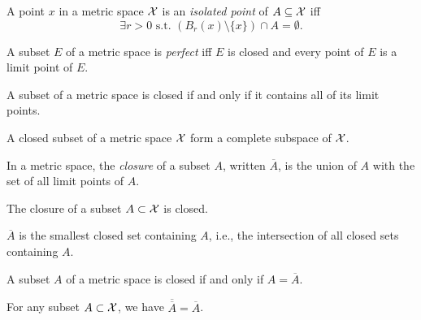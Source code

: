 \begin{defn}
  A point $x$ in a metric space ${\cal X}$
   is an \emph{isolated point} of $A\subseteq {\cal X}$ iff
  \begin{equation}
    \label{eq:isolatedPointMetricSpace}
    \exists r>0 \text{ s.t. } \left(B_r(x)\setminus\{x\}\right)\cap A
    = \emptyset. 
  \end{equation}
\end{defn}

\begin{defn}
  \label{def:perfectSets}
  A subset $E$ of a metric space is \emph{perfect}
  iff $E$ is closed and every point of $E$
  is a limit point of $E$.
\end{defn}

\begin{lem}
  \label{lem:closedSetsContainsAllLimitPoints}
  A subset of a metric space is closed
  if and only if it contains all of its limit points.
\end{lem}

\begin{coro}
  \label{coro:closedSubsetIsComplete}
  A closed subset of a metric space ${\cal X}$
  form a complete subspace of ${\cal X}$.
\end{coro}

\begin{defn}
  \label{def:closureInMetricSpace}
  In a metric space, 
  the \emph{closure} of a subset $A$,
  written $\overline{A}$,
  is the union of $A$ with the set of all limit points of $A$. 
\end{defn}

\begin{lem}
  \label{lem:closureIsClosed}
  The closure of a subset $A\subset{\cal X}$ is closed.
\end{lem}

\begin{coro}
  \label{coro:closureBeingSmallest}
  $\overline{A}$ is the smallest closed set containing $A$, 
  i.e., the intersection of all closed sets containing $A$.
\end{coro}

\begin{coro}
  \label{coro:closedFromClosure}
  A subset $A$ of a metric space is closed
  if and only if $A=\overline{A}$.
\end{coro}

\begin{coro}
  \label{coro:closureIdempotence}
  For any subset $A\subset {\cal X}$,
  we have $\overline{\overline{A}}=\overline{A}$. 
\end{coro}

